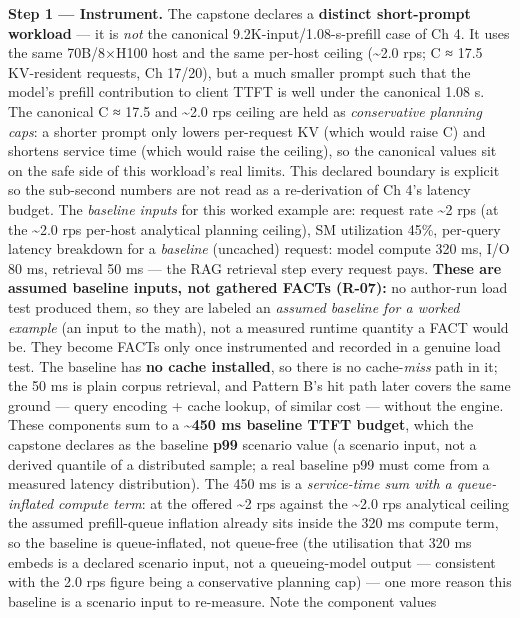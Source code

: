 \textbf{Step 1 --- Instrument.} The capstone declares a \textbf{distinct
short-prompt workload} --- it is \emph{not} the canonical
9.2K-input/1.08-s-prefill case of Ch 4. It uses the same 70B/8×H100 host
and the same per-host ceiling (\textasciitilde2.0 rps; C ≈ 17.5
KV-resident requests, Ch 17/20), but a much smaller prompt such that the
model's prefill contribution to client TTFT is well under the canonical
1.08 s. The canonical C ≈ 17.5 and \textasciitilde2.0 rps ceiling are
held as \emph{conservative planning caps}: a shorter prompt only lowers
per-request KV (which would raise C) and shortens service time (which
would raise the ceiling), so the canonical values sit on the safe side
of this workload's real limits. This declared boundary is explicit so
the sub-second numbers are not read as a re-derivation of Ch 4's latency
budget. The \emph{baseline inputs} for this worked example are: request
rate \textasciitilde2 rps (at the \textasciitilde2.0 rps per-host
analytical planning ceiling), SM utilization 45\%, per-query latency
breakdown for a \emph{baseline} (uncached) request: model compute 320
ms, I/O 80 ms, retrieval 50 ms --- the RAG retrieval step every request
pays. \textbf{These are assumed baseline inputs, not gathered FACTs
(R-07):} no author-run load test produced them, so they are labeled an
\emph{assumed baseline for a worked example} (an input to the math), not
a measured runtime quantity a FACT would be. They become FACTs only once
instrumented and recorded in a genuine load test. The baseline has
\textbf{no cache installed}, so there is no cache-\emph{miss} path in
it; the 50 ms is plain corpus retrieval, and Pattern B's hit path later
covers the same ground --- query encoding + cache lookup, of similar
cost --- without the engine. These components sum to a
\textbf{\textasciitilde450 ms baseline TTFT budget}, which the capstone
declares as the baseline \textbf{p99} scenario value (a scenario input,
not a derived quantile of a distributed sample; a real baseline p99 must
come from a measured latency distribution). The 450 ms is a
\emph{service-time sum with a queue-inflated compute term}: at the
offered \textasciitilde2 rps against the \textasciitilde2.0 rps
analytical ceiling the assumed prefill-queue inflation already sits
inside the 320 ms compute term, so the baseline is queue-inflated, not
queue-free (the utilisation that 320 ms embeds is a declared scenario
input, not a queueing-model output --- consistent with the 2.0 rps
figure being a conservative planning cap) --- one more reason this
baseline is a scenario input to re-measure. Note the component values
